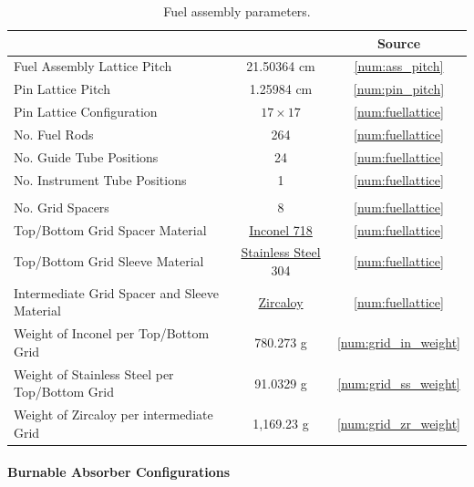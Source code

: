 \begin{table}[htpb]
  
  \caption{Fuel assembly parameters. \label{table_assembly_overview}}
  
  \begin{tabularx}{\textwidth}{l C c}

    \toprule
    & & Source\\
    \midrule
    \midrule
    Fuel Assembly Lattice Pitch & 21.50364 cm & \ref{num:ass_pitch}\\
    Pin Lattice Pitch & 1.25984 cm & \ref{num:pin_pitch}\\
    Pin Lattice Configuration & $17 \times 17$ & \ref{num:fuellattice}\\
    No. Fuel Rods & 264 & \ref{num:fuellattice}\\
    No. Guide Tube Positions & 24 & \ref{num:fuellattice}\\
    No. Instrument Tube Positions & 1 & \ref{num:fuellattice}\\
    \\
    No. Grid Spacers & 8 & \ref{num:fuellattice}\\
    Top/Bottom Grid Spacer Material & \hyperref[mat_inconel]{Inconel 718} & \ref{num:fuellattice} \\
    Top/Bottom Grid Sleeve Material & \hyperref[mat_SS304]{Stainless Steel} 304 & \ref{num:fuellattice} \\
    Intermediate Grid Spacer and Sleeve Material & \hyperref[mat_zirc]{Zircaloy} & \ref{num:fuellattice} \\
    Weight of Inconel per Top/Bottom Grid & 780.273 g & \ref{num:grid_in_weight}\\
    Weight of Stainless Steel per Top/Bottom Grid & 91.0329 g & \ref{num:grid_ss_weight}\\
    Weight of Zircaloy per intermediate Grid & 1,169.23 g & \ref{num:grid_zr_weight}\\
    \bottomrule 
  \end{tabularx}
  
\end{table}
\FloatBarrier


\FloatBarrier
\paragraph{Burnable Absorber Configurations}
\label{sec:ba_configs}

